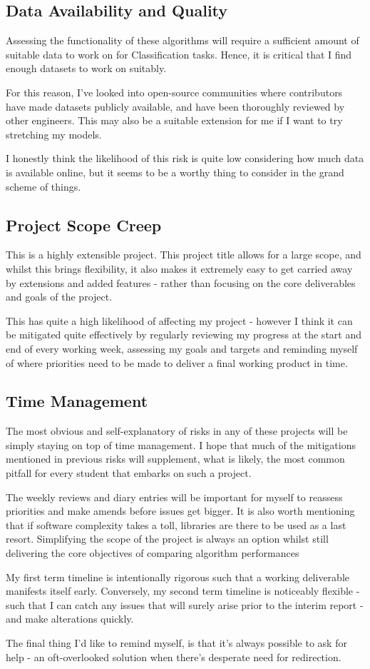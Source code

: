 \documentclass[report,10pt]{article}
\begin{document}
\subsection{Data Availability and Quality}
Assessing the functionality of these algorithms will require a sufficient amount of suitable data to work on for Classification tasks. Hence, it is critical that I find enough datasets to work on suitably. \par
For this reason, I've looked into open-source communities where contributors have made datasets publicly available, and have been thoroughly reviewed by other engineers. This may also be a suitable extension for me if I want to try stretching my models. \par
I honestly think the likelihood of this risk is quite low considering how much data is available online, but it seems to be a worthy thing to consider in the grand scheme of things. \par
\subsection{Project Scope Creep}
This is a highly extensible project. This project title allows for a large scope, and whilst this brings flexibility, it also makes it extremely easy to get carried away by extensions and added features - rather than focusing on the core deliverables and goals of the project. \par
This has quite a high likelihood of affecting my project - however I think it can be mitigated quite effectively by regularly reviewing my progress at the start and end of every working week, assessing my goals and targets and reminding myself of where priorities need to be made to deliver a final working product in time. 
\subsection{Time Management}
The most obvious and self-explanatory of risks in any of these projects will be simply staying on top of time management. I hope that much of the mitigations mentioned in previous risks will supplement, what is likely, the most common pitfall for every student that embarks on such a project. \par
The weekly reviews and diary entries will be important for myself to reassess priorities and make amends before issues get bigger. It is also worth mentioning that if software complexity takes a toll, libraries are there to be used as a last resort. Simplifying the scope of the project is always an option whilst still delivering the core objectives of comparing algorithm performances \par
My first term timeline is intentionally rigorous such that a working deliverable manifests itself early. Conversely, my second term timeline is noticeably flexible - such that I can catch any issues that will surely arise prior to the interim report - and make alterations quickly. \par
The final thing I'd like to remind myself, is that it's always possible to ask for help - an oft-overlooked solution when there's desperate need for redirection.

\pagebreak


\end{document}
